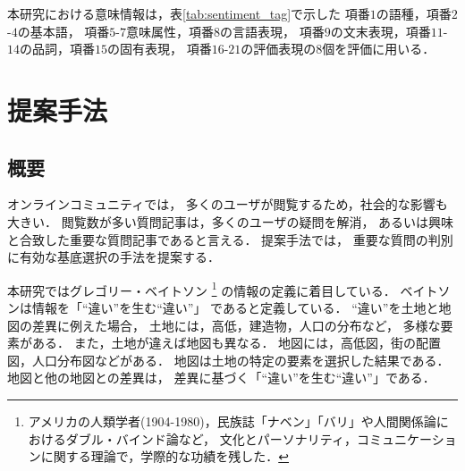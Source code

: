 \documentclass[12pt,a4paper,twocolumn,twoside]{jsik}
\begin{document}
%
%
\renewcommand\thefootnote{\arabic{footnote}}

本研究における意味情報は，表\ref{tab:sentiment_tag}で示した
項番$1$の語種，項番$2$-$4$の基本語，
項番$5$-$7$意味属性，項番$8$の言語表現，
項番$9$の文末表現，項番$11$-$14$の品詞，項番$15$の固有表現，
項番$16$-$21$の評価表現の8個を評価に用いる．

\section{提案手法}

\subsection{概要}
オンラインコミュニティでは，
多くのユーザが閲覧するため，社会的な影響も大きい．
%
閲覧数が多い質問記事は，多くのユーザの疑問を解消，
あるいは興味と合致した重要な質問記事であると言える．
%
提案手法では，
重要な質問の判別に有効な基底選択の手法を提案する．

本研究ではグレゴリー・ベイトソン
\footnote{
アメリカの人類学者(1904-1980)，民族誌「ナベン」「バリ」や人間関係論におけるダブル・バインド論など，
文化とパーソナリティ，コミュニケーションに関する理論で，学際的な功績を残した．
}
の情報の定義に着目している．
ベイトソンは情報を「``違い''を生む``違い''」
であると定義している\cite{definition_information}．
%
``違い''を土地と地図の差異に例えた場合，
土地には，高低，建造物，人口の分布など，
多様な要素がある\cite{what_information}．
また，土地が違えば地図も異なる．
地図には，高低図，街の配置図，人口分布図などがある．
%
地図は土地の特定の要素を選択した結果である．
地図と他の地図との差異は，
差異に基づく「``違い''を生む``違い''」である．
\end{document}
